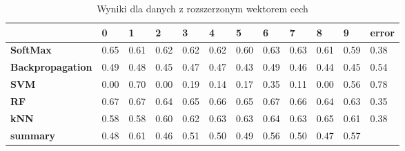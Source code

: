 \documentclass{article}
\begin{document}
\begin{table}[htp]
	\centering
	\caption{Wyniki dla danych z rozszerzonym wektorem cech}
	\label{extended-vector-results}
\begin{tabular}{l|l|l|l|l|l|l|l|l|l|l|l|}
	\cline{2-12}
	& \textbf{0} & \textbf{1} & \textbf{2} & \textbf{3} & \textbf{4} & \textbf{5} & \textbf{6} & \textbf{7} & \textbf{8} & \textbf{9} & \textbf{error} \\ \hline
	\multicolumn{1}{|l|}{\textbf{SoftMax}}         & 0.65          & 0.61          & 0.62          & 0.62          & 0.62          & 0.60          & 0.63          & 0.63          & 0.61          & 0.59          & 0.38                \\ \hline
	\multicolumn{1}{|l|}{\textbf{Backpropagation}} & 0.49          & 0.48          & 0.45          & 0.47          & 0.47          & 0.43          & 0.49          & 0.46          & 0.44          & 0.45          & 0.54                \\ \hline
	\multicolumn{1}{|l|}{\textbf{SVM}}             & 0.00          & 0.70          & 0.00          & 0.19          & 0.14          & 0.17          & 0.35          & 0.11          & 0.00          & 0.56          & 0.78                \\ \hline
	\multicolumn{1}{|l|}{\textbf{RF}}              & 0.67          & 0.67          & 0.64          & 0.65          & 0.66          & 0.65          & 0.67          & 0.66          & 0.64          & 0.63          & 0.35                \\ \hline
	\multicolumn{1}{|l|}{\textbf{kNN}}             & 0.58          & 0.58          & 0.60          & 0.62          & 0.63          & 0.63          & 0.64          & 0.63          & 0.65          & 0.61          & 0.38                \\ \hline
	\multicolumn{1}{|l|}{\textbf{summary}}         & 0.48          & 0.61          & 0.46          & 0.51          & 0.50          & 0.49          & 0.56          & 0.50          & 0.47          & 0.57          &                     \\ \hline
\end{tabular}
\end{table}
\end{document}
